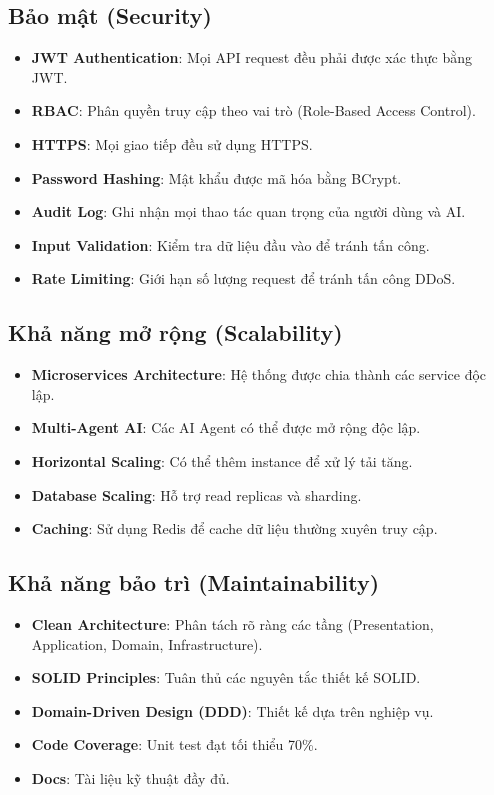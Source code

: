 \documentclass[12pt,a4paper]{report}
\begin{document}
\subsection{Bảo mật (Security)}

\begin{itemize}
\item \textbf{JWT Authentication}: Mọi API request đều phải được xác thực bằng JWT.
\item \textbf{RBAC}: Phân quyền truy cập theo vai trò (Role-Based Access Control).
\item \textbf{HTTPS}: Mọi giao tiếp đều sử dụng HTTPS.
\item \textbf{Password Hashing}: Mật khẩu được mã hóa bằng BCrypt.
\item \textbf{Audit Log}: Ghi nhận mọi thao tác quan trọng của người dùng và AI.
\item \textbf{Input Validation}: Kiểm tra dữ liệu đầu vào để tránh tấn công.
\item \textbf{Rate Limiting}: Giới hạn số lượng request để tránh tấn công DDoS.
\end{itemize}

\subsection{Khả năng mở rộng (Scalability)}

\begin{itemize}
\item \textbf{Microservices Architecture}: Hệ thống được chia thành các service độc lập.
\item \textbf{Multi-Agent AI}: Các AI Agent có thể được mở rộng độc lập.
\item \textbf{Horizontal Scaling}: Có thể thêm instance để xử lý tải tăng.
\item \textbf{Database Scaling}: Hỗ trợ read replicas và sharding.
\item \textbf{Caching}: Sử dụng Redis để cache dữ liệu thường xuyên truy cập.
\end{itemize}

\subsection{Khả năng bảo trì (Maintainability)}

\begin{itemize}
\item \textbf{Clean Architecture}: Phân tách rõ ràng các tầng (Presentation, Application, Domain, Infrastructure).
\item \textbf{SOLID Principles}: Tuân thủ các nguyên tắc thiết kế SOLID.
\item \textbf{Domain-Driven Design (DDD)}: Thiết kế dựa trên nghiệp vụ.
\item \textbf{Code Coverage}: Unit test đạt tối thiểu 70\%.
\item \textbf{Docs}: Tài liệu kỹ thuật đầy đủ.
\end{itemize}
\end{document}
